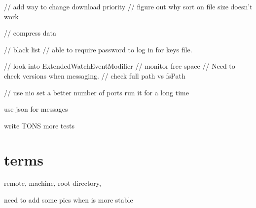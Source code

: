 \documentclass{article}
\begin{document}
        // add way to change download priority
        // figure out why sort on file size doesn't work
        
        // compress data
        
        // black list
        // able to require password to log in for keys file.
        
		// look into ExtendedWatchEventModifier
		// monitor free space
		// Need to check versions when messaging.
		// check full path vs fsPath


 // use nio
 set a better number of ports
 run it for a long time


use json for messages





write TONS more tests





\section{terms}
remote, machine, root directory, 

need to add some pics when is more stable
\end{document}
